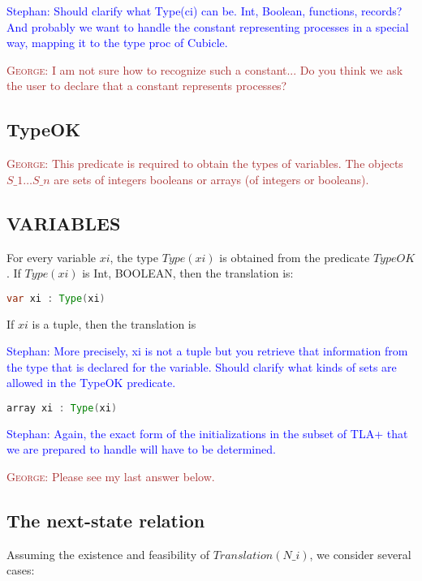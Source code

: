 \documentclass{article}
\theoremstyle{plain}
\numberwithin{equation}{section}
\newcommand{\george}[1]{\textcolor{brown}{\textsc{George: } {\sf #1}}}
\newcommand{\ste}[1]{\par\noindent\textcolor{blue}{\small Stephan: #1}}
\begin{document}
\ste{Should clarify what Type(ci) can be. Int, Boolean, functions, records? And
  probably we want to handle the constant representing processes in a special
  way, mapping it to the type proc of Cubicle.}

\george{I am not sure how to recognize such a constant... Do you think we ask the user to declare that a constant represents processes?  }


\subsection*{TypeOK} \george{This predicate is required to obtain the types of variables. The objects $S\_1 \dots S\_n$ are sets of integers booleans or arrays (of integers or booleans).  } 




\subsection*{VARIABLES} For every variable $xi$, the type  \emph{$Type(xi)$} is obtained from the predicate \emph{$TypeOK$}. If \emph{$Type(xi)$} is Int, BOOLEAN, then the translation is: 

\begin{lstlisting}[language=Java]
var xi : Type(xi) 
\end{lstlisting}

If $xi$ is a tuple, then the translation is 

\ste{More precisely, xi is not a tuple but you retrieve that information from
  the type that is declared for the variable. Should clarify what kinds of sets
  are allowed in the TypeOK predicate.}

\begin{lstlisting}[language=Java]
array xi : Type(xi) 
\end{lstlisting}


\ste{Again, the exact form of the initializations in the subset of TLA+ that we
  are prepared to handle will have to be determined.}

\george{Please see my last answer below.}

\subsection*{The next-state relation} 
Assuming the existence and feasibility of \emph{$Translation(N\_i)$}, we consider several cases:
\end{document}
